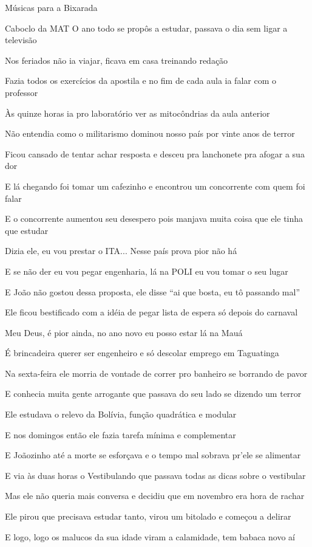 \begin{secao}{Músicas para a Bixarada}
\begin{subsecao}{Caboclo da MAT}
O ano todo se propôs a estudar, passava o dia sem ligar a televisão

Nos feriados não ia viajar, ficava em casa treinando redação

Fazia todos os exercícios da apostila e no fim de cada aula ia falar com o
professor

Às quinze horas ia pro laboratório ver as mitocôndrias da aula anterior

Não entendia como o militarismo dominou nosso país por vinte anos de terror

Ficou cansado de tentar achar resposta e desceu pra lanchonete pra afogar a sua
dor

E lá chegando foi tomar um cafezinho e encontrou um concorrente com quem foi
falar

E o concorrente aumentou seu desespero pois manjava muita coisa que ele tinha
que estudar

Dizia ele, eu vou prestar o ITA... Nesse país prova pior não há

E se não der eu vou pegar engenharia, lá na POLI eu vou tomar o seu lugar

E João não gostou dessa proposta, ele disse ``ai que bosta, eu tô passando mal''

Ele ficou bestificado com a idéia de pegar lista de espera só depois do carnaval

Meu Deus, é pior ainda, no ano novo eu posso estar lá na Mauá

É brincadeira querer ser engenheiro e só descolar emprego em Taguatinga

Na sexta-feira ele morria de vontade de correr pro banheiro se borrando de pavor

E conhecia muita gente arrogante que passava do seu lado se dizendo um terror

Ele estudava o relevo da Bolívia, função quadrática e modular

E nos domingos então ele fazia tarefa mínima e complementar

E Joãozinho até a morte se esforçava e o tempo mal sobrava pr'ele se alimentar

E via às duas horas o Vestibulando que passava todas as dicas sobre o vestibular

Mas ele não queria mais conversa e decidiu que em novembro era hora de rachar

Ele pirou que precisava estudar tanto, virou um bitolado e começou a delirar

E logo, logo os malucos da sua idade viram a calamidade, tem babaca novo aí


\end{subsecao}
\end{secao}
